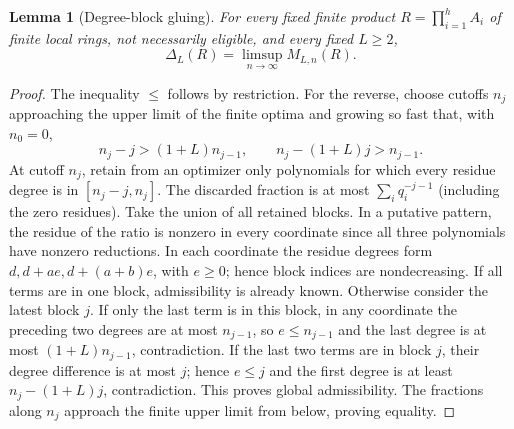 \documentclass[11pt]{article}
\newtheorem{lemma}[theorem]{Lemma}
\theoremstyle{remark}\newtheorem{remark}[theorem]{Remark}
\begin{document}
\begin{lemma}[Degree-block gluing]\label{lem:glue}
For every fixed finite product $R=\prod_{i=1}^h A_i$ of finite local rings, not necessarily eligible, and every fixed $L\ge2$,
\[
 \Delta_L(R)=\limsup_{n\to\infty}M_{L,n}(R).
\]
\end{lemma}
\begin{proof}
The inequality $\le$ follows by restriction. For the reverse, choose cutoffs $n_j$ approaching the upper limit of the finite optima and growing so fast that, with $n_0=0$,
\[
 n_j-j>(1+L)n_{j-1},\qquad n_j-(1+L)j>n_{j-1}.
\]
At cutoff $n_j$, retain from an optimizer only polynomials for which every residue degree is in $[n_j-j,n_j]$. The discarded fraction is at most $\sum_i q_i^{-j-1}$ (including the zero residues). Take the union of all retained blocks. In a putative pattern, the residue of the ratio is nonzero in every coordinate since all three polynomials have nonzero reductions. In each coordinate the residue degrees form $d,d+ae,d+(a+b)e$, with $e\ge0$; hence block indices are nondecreasing. If all terms are in one block, admissibility is already known. Otherwise consider the latest block $j$. If only the last term is in this block, in any coordinate the preceding two degrees are at most $n_{j-1}$, so $e\le n_{j-1}$ and the last degree is at most $(1+L)n_{j-1}$, contradiction. If the last two terms are in block $j$, their degree difference is at most $j$; hence $e\le j$ and the first degree is at least $n_j-(1+L)j$, contradiction. This proves global admissibility. The fractions along $n_j$ approach the finite upper limit from below, proving equality.
\end{proof}
\end{document}
